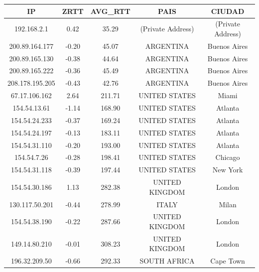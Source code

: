 \begin{tabular}{|c@{\hspace{5ex}}c@{\hspace{5ex}}c@{\hspace{5ex}}c@{\hspace{5ex}}c|}
\hline
\rule{0pt}{1.2em}IP & ZRTT & AVG\_RTT & PAIS & CIUDAD\\[0.2em]
\hline

\rule{0pt}{1.2em} 192.168.2.1  &  0.42 & 35.29 & (Private Address) & (Private Address) \\[0.2em]
\rule{0pt}{1.2em} 200.89.164.177  &  -0.20 & 45.07 & ARGENTINA & Buenos Aires \\[0.2em]
\rule{0pt}{1.2em} 200.89.165.130  &  -0.38 & 44.64 & ARGENTINA & Buenos Aires \\[0.2em]
\rule{0pt}{1.2em} 200.89.165.222  &  -0.36 & 45.49 & ARGENTINA & Buenos Aires \\[0.2em]
\rule{0pt}{1.2em} 208.178.195.205  &  -0.43 & 42.76 & ARGENTINA & Buenos Aires\\[0.2em]
\rule{0pt}{1.2em} 67.17.106.162  &  2.64 & 211.71 & UNITED STATES & Miami \\[0.2em]
\rule{0pt}{1.2em} 154.54.13.61  &  -1.14 & 168.90 & UNITED STATES & Atlanta \\[0.2em]
\rule{0pt}{1.2em} 154.54.24.233  &  -0.37 & 169.24 & UNITED STATES & Atlanta \\[0.2em]
\rule{0pt}{1.2em} 154.54.24.197  &  -0.13 & 183.11 & UNITED STATES & Atlanta \\[0.2em]
\rule{0pt}{1.2em} 154.54.31.110  &  -0.20 & 193.00 & UNITED STATES & Atlanta \\[0.2em]
\rule{0pt}{1.2em} 154.54.7.26  &  -0.28 & 198.41 & UNITED STATES & Chicago \\[0.2em]
\rule{0pt}{1.2em} 154.54.31.118  &  -0.39 & 197.44 & UNITED STATES & New York \\[0.2em]
\rule{0pt}{1.2em} 154.54.30.186  &  1.13 & 282.38 & UNITED KINGDOM & London \\[0.2em]
\rule{0pt}{1.2em} 130.117.50.201  &  -0.44 & 278.99 & ITALY & Milan \\[0.2em]
\rule{0pt}{1.2em} 154.54.38.190  &  -0.22 & 287.66 & UNITED KINGDOM & London \\[0.2em]
\rule{0pt}{1.2em} 149.14.80.210  &  -0.01 & 308.23  & UNITED KINGDOM & London \\[0.2em]
\rule{0pt}{1.2em} 196.32.209.50  &  -0.66 & 292.33 & SOUTH AFRICA & Cape Town \\[0.2em]

\end{tabular}

